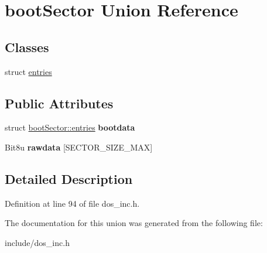 \hypertarget{unionbootSector}{\section{boot\-Sector Union Reference}
\label{unionbootSector}
}
\subsection*{Classes}
\begin{DoxyCompactItemize}
\item 
struct \hyperlink{structbootSector_1_1entries}{entries}
\end{DoxyCompactItemize}
\subsection*{Public Attributes}
\begin{DoxyCompactItemize}
\item 
\hypertarget{unionbootSector_a830dde936204711342d54f9150fedeaf}{struct \hyperlink{structbootSector_1_1entries}{boot\-Sector\-::entries} {\bfseries bootdata}}\label{unionbootSector_a830dde936204711342d54f9150fedeaf}

\item 
\hypertarget{unionbootSector_a12f04513323fa2f1f73ce3deb4814732}{Bit8u {\bfseries rawdata} \mbox{[}S\-E\-C\-T\-O\-R\-\_\-\-S\-I\-Z\-E\-\_\-\-M\-A\-X\mbox{]}}\label{unionbootSector_a12f04513323fa2f1f73ce3deb4814732}

\end{DoxyCompactItemize}


\subsection{Detailed Description}


Definition at line 94 of file dos\-\_\-inc.\-h.



The documentation for this union was generated from the following file\-:\begin{DoxyCompactItemize}
\item 
include/dos\-\_\-inc.\-h\end{DoxyCompactItemize}
